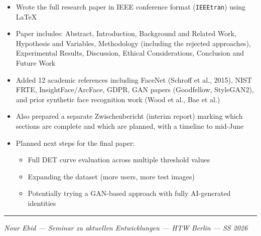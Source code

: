 \documentclass[11pt,a4paper]{article}
\begin{document}
\begin{itemize}
    \item Wrote the full research paper in IEEE conference format (\texttt{IEEEtran}) using LaTeX
    \item Paper includes: Abstract, Introduction, Background and Related Work, Hypothesis and Variables, Methodology (including the rejected approaches), Experimental Results, Discussion, Ethical Considerations, Conclusion and Future Work
    \item Added 12 academic references including FaceNet (Schroff et al., 2015), NIST FRTE, InsightFace/ArcFace, GDPR, GAN papers (Goodfellow, StyleGAN2), and prior synthetic face recognition work (Wood et al., Bae et al.)
    \item Also prepared a separate Zwischenbericht (interim report) marking which sections are complete and which are planned, with a timeline to mid-June
    \item Planned next steps for the final paper:
    \begin{itemize}
        \item Full DET curve evaluation across multiple threshold values
        \item Expanding the dataset (more users, more test images)
        \item Potentially trying a GAN-based approach with fully AI-generated identities
    \end{itemize}
\end{itemize}

\vspace{12pt}
\hrule
\vspace{8pt}
\begin{center}
\small\textit{Nour Ebid --- Seminar zu aktuellen Entwicklungen --- HTW Berlin --- SS 2026}
\end{center}
\end{document}
